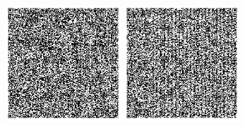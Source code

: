 \documentclass[twocolumn]{article}
\newcommand{\stopsquarepar}{%
    \par\endgroup}
\begin{document}
\includegraphics[height=1.7in]{q13}
\includegraphics[height=1.7in]{q14}
\stopsquarepar

{}

\end{document}
